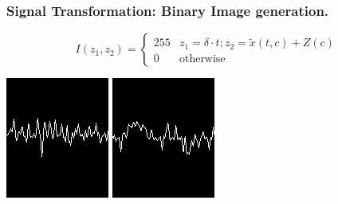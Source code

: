 \documentclass[11pt]{beamer}
\begin{document}
	\begin{frame}
	\frametitle{Signal Transformation: Binary Image generation.}
	\begin{center}
	
\begin{equation}
I(z_1,z_2) = \left\{ \begin{array}{rl}
255      & z_1 = \delta \cdot t;  z_2 = \tilde{x}(t,c) + Z(c)   \\
0   & \mbox{otherwise}
\end{array}\right. 
\end{equation}

		\includegraphics[scale=2]{img/SignalSample.png} 
		\includegraphics[scale=2]{img/SignalSample2.png} 
		

        \end{center}
    \end{frame}


    
\end{document}
